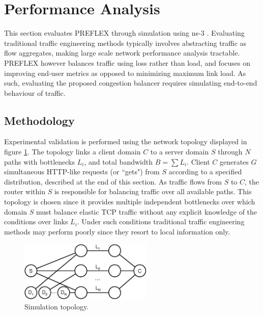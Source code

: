 \section{Performance Analysis}

This section evaluates \ac{PREFLEX} through simulation using ns-3 \cite{ns3}. 
Evaluating traditional traffic engineering methods typically involves abstracting traffic as flow aggregates, making large scale network performance analysis tractable.
\ac{PREFLEX} however balances traffic using loss rather than load, and focuses on improving end-user metrics as opposed to minimizing maximum link load.
As such, evaluating the proposed congestion balancer requires simulating end-to-end behaviour of traffic.

\subsection{Methodology}
\label{section:methodology}

Experimental validation is performed using the network topology displayed in figure \ref{fig:topo}. 
The topology links a client domain $C$ to a server domain $S$ through $N$ paths with bottlenecks $L_i$, and total bandwidth $B=\sum{L_i}$. 
Client $C$ generates $G$ simultaneous \ac{HTTP}-like requests (or ``gets") from $S$ according to a specified distribution, described at the end of this section. 
As traffic flows from $S$ to $C$, the router within $S$ is responsible for balancing traffic over all available paths.
This topology is chosen since it provides multiple independent bottlenecks over which domain $S$ must balance elastic \ac{TCP} traffic without any explicit knowledge of the conditions over links $L_i$.
Under such conditions traditional traffic engineering methods may perform poorly since they resort to local information only.

\begin{figure}
    \centering
    \includegraphics[width=2.5in]{figures/cate/topo}
    \caption{Simulation topology.}
    \label{fig:topo}
\end{figure}

